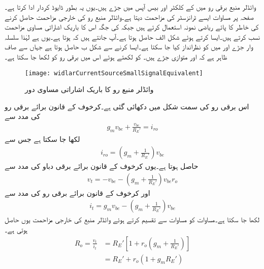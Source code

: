 وائڈلر منبع برقی رو میں  کے کلکٹر اور بیس آپس میں جڑے ہیں۔یوں یہ بطور ڈایوڈ کردار ادا کرتا ہے۔صفحہ  پر مساوات  ایسے ٹرانزسٹر کی مزاحمت  دیتا ہے۔وائڈلر منبع رو کی خارجی مزاحمت حاصل کرنے کی خاطر  کا پائے ریاضی نمونہ استعمال کرتے ہیں جبکہ  کی جگہ اس کا باریک اشاراتی مساوی مزاحمت  نسب کرتے ہیں۔ایسا کرتے ہوئے شکل  الف حاصل ہوتا ہے۔آپ جانتے ہیں کہ  ہوتا ہے۔یوں  ہے لہٰذا سلسلہ وار جڑے  اور  میں  کو نظرانداز کیا جا سکتا ہے۔ایسا کرنے سے شکل  ب حاصل ہوتا ہے جہاں سے صاف ظاہر ہے کہ  اور  متوازی جڑے ہیں۔ کو  لکھتے ہوئے اس میں برقی رو کو  لکھا جا سکتا ہے۔
%
\begin{figure}
\centering
\texttt{[image: widlarCurrentSourceSmallSignalEquivalent]}
\caption{وائڈلر منبع رو کا باریک اشاراتی مساوی دور}
\label{شکل_تفرقی_وائڈلر_پیداکار_برقی_رو_مساوی}
\end{figure}
اس برقی رو کی سمت شکل میں دکھائی گئی ہے۔کرخوف کے قانون برائے برقی رو کی مدد سے
\begin{align*}
g_m v_{be}+\frac{v_{be}}{R_E'}=i_{ro} 
\end{align*}
لکھا جا سکتا ہے جس سے
\begin{align*}
i_{ro}=\left(g_m +\frac{1}{R_E'} \right) v_{be}
\end{align*}
حاصل ہوتا ہے۔یوں کرخوف کے قانون برائے برقی دباو کی مدد سے
\begin{align}\label{مساوات_تفرقی_وائڈلر_ٹیسٹ_برقی_دباو}
v_t=-v_{be}-\left(g_m +\frac{1}{R_E'} \right) v_{be} r_o
\end{align}
اور کرخوف کے قانون برائے برقی رو کی مدد سے
\begin{align}\label{مساوات_تفرقی_وائڈلر_ٹیسٹ_برقی_رو}
i_t=g_m v_{be}-\left(g_m +\frac{1}{R_E'} \right) v_{be}
\end{align}
لکھا جا سکتا ہے۔مساوات  کو مساوات  سے تقسیم کرتے ہوئے وائڈلر منبع کی خارجی مزاحمت  یوں حاصل ہوتی ہے۔
\begin{align*}
R_o=\frac{v_t}{i_t}&=R_E' \left[1+r_o \left(g_m+\frac{1}{R_E'} \right) \right]\\
&=R_E'+r_o\left(1+g_m R_E' \right)
\end{align*}
